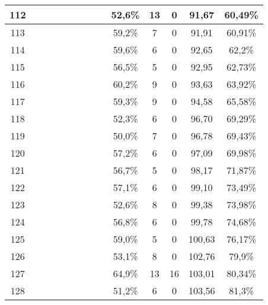 \begin{longtable}{|c|c|c|c|c|c|c|c|c|c|c|c|c|c|}
112 &  \x    & \x    &       &       &       &       &       & \x\m  & 52,6\% &  13 & 0  & 91,67 & 60,49\% \\ \hline
113 &  \x    & \x    & \x    &       &       & \x\m  &       & \x\m  & 59,2\% &  7  & 0  & 91,91 & 60,91\% \\ \hline
114 &  \x    & \x    & \x    &       &       & \x\m  & \x\m  &       & 59,6\% &  6  & 0  & 92,65 & 62,2\% \\ \hline
115 &  \x    & \x    &       & \x    & \x    & \x    &       & \x    & 56,5\% &  5  & 0  & 92,95 & 62,73\% \\ \hline
116 &  \x    & \x    & \x    &       &       &       & \x\m  &       & 60,2\% &  9  & 0  & 93,63 & 63,92\% \\ \hline
117 &  \x    & \x    & \x    &       &       & \x\m  & \x    &       & 59,3\% &  9  & 0  & 94,58 & 65,58\% \\ \hline
118 &  \x    & \x    &       &       &       &       &       & \x    & 52,3\% &  6  & 0  & 96,70 & 69,29\% \\ \hline
119 &  \x    & \x    &       &       &       & \x\m  &       &       & 50,0\% &  7  & 0  & 96,78 & 69,43\% \\ \hline
120 &  \x    & \x    &       &       & \x    &       &       & \x    & 57,2\% &  6  & 0  & 97,09 & 69,98\% \\ \hline
121 &  \x    & \x    &       & \x    & \x    & \x    & \x    &       & 56,7\% &  5  & 0  & 98,17 & 71,87\% \\ \hline
122 &  \x    & \x    &       &       & \x    & \x    &       & \x    & 57,1\% &  6  & 0  & 99,10 & 73,49\% \\ \hline
123 &  \x    & \x    &       &       &       &       & \x    &       & 52,6\% &  8  & 0  & 99,38 & 73,98\% \\ \hline
124 &  \x    & \x    &       &       & \x    &       & \x    &       & 56,8\% &  6  & 0  & 99,78 & 74,68\% \\ \hline
125 &  \x    & \x    & \x    &       &       & \x\m  &       & \x    & 59,0\% &  5  & 0  & 100,63 & 76,17\% \\ \hline
126 &  \x    & \x    &       & \x    &       &       &       & \x\m  & 53,1\% &  8  & 0  & 102,76 & 79,9\% \\ \hline
127 &  \x    & \x    &       & \x    & \x\m  &       & \x\m  &       & 64,9\% &  13 & 16 & 103,01 & 80,34\% \\ \hline
128 &  \x    & \x    &       &       &       & \x    & \x    &       & 51,2\% &  6  & 0  & 103,56 & 81,3\% \\ \hline

\end{longtable}
